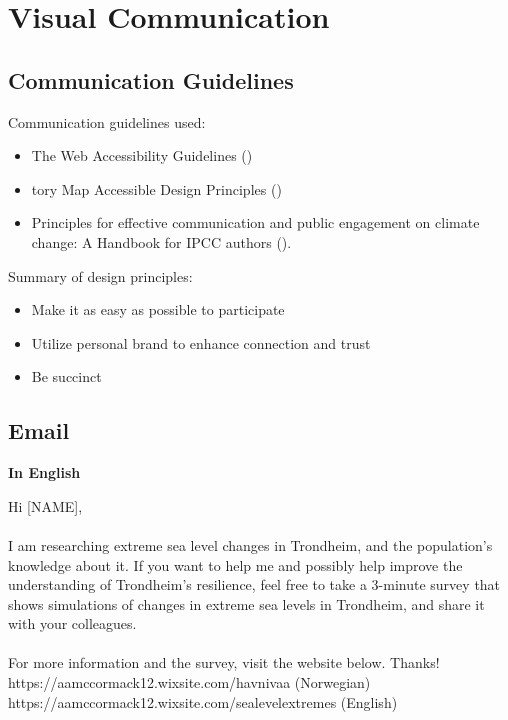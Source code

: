 \section{Visual Communication}

\subsection{Communication Guidelines}

Communication guidelines used:
\begin{itemize}
    \item The Web Accessibility Guidelines (\cite{henry_web_2022})
    \item tory Map Accessible Design Principles (\cite{todd_liz_getting_nodate}) 
    \item Principles for effective communication and public engagement on	climate change: A Handbook for IPCC authors (\cite{corner_a_principles_2018}).
\end{itemize}


Summary of design principles:
\begin{itemize}
    \item Make it as easy as possible to participate
    \item Utilize personal brand to enhance connection and trust
    \item Be succinct
\end{itemize}
\paragraph{}

\newpage
\subsection{Email}
\textbf{In English}

Hi [NAME],
\paragraph{}
I am researching extreme sea level changes in Trondheim, and the population's knowledge about it. If you want to help me and possibly help improve the understanding of Trondheim's resilience, feel free to take a 3-minute survey that shows simulations of changes in extreme sea levels in Trondheim, and share it with your colleagues. 
\paragraph{}
For more information and the survey, visit the website below. Thanks! https://aamccormack12.wixsite.com/havnivaa (Norwegian) https://aamccormack12.wixsite.com/sealevelextremes (English)
